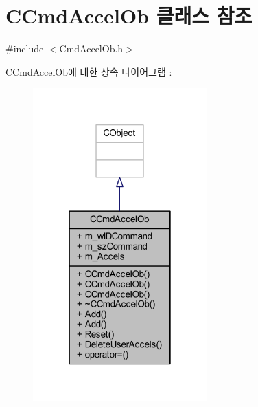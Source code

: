 \hypertarget{class_c_cmd_accel_ob}{}\section{C\+Cmd\+Accel\+Ob 클래스 참조}
\label{class_c_cmd_accel_ob}


{\ttfamily \#include $<$Cmd\+Accel\+Ob.\+h$>$}



C\+Cmd\+Accel\+Ob에 대한 상속 다이어그램 \+: \nopagebreak
\begin{figure}[H]
\begin{center}
\leavevmode
\includegraphics[width=190pt]{class_c_cmd_accel_ob__inherit__graph}
\end{center}
\end{figure}


